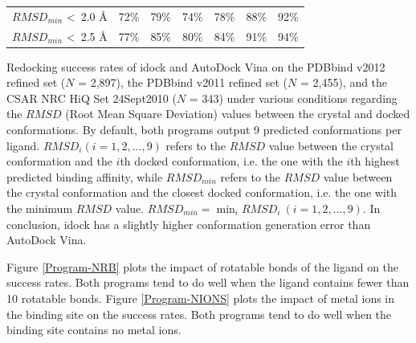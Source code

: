 \begin{table}
\begin{tabular}{lrrrrrr}
$RMSD_{min}$ \textless\ 2.0 \AA & 72\% & 79\% & 74\% & 78\% & 88\% & 92\%\\
$RMSD_{min}$ \textless\ 2.5 \AA & 77\% & 85\% & 80\% & 84\% & 91\% & 94\%\\
\end{tabular}
\begin{flushleft}
\label{SuccessRate} Redocking success rates of idock and AutoDock Vina on the PDBbind v2012 refined set ($N$ = 2,897), the PDBbind v2011 refined set ($N$ = 2,455), and the CSAR NRC HiQ Set 24Sept2010 ($N$ = 343) under various conditions regarding the $RMSD$ (Root Mean Square Deviation) values between the crystal and docked conformations. By default, both programs output 9 predicted conformations per ligand. $RMSD_i (i = 1,2,...,9)$ refers to the $RMSD$ value between the crystal conformation and the $i$th docked conformation, i.e. the one with the $i$th highest predicted binding affinity, while $RMSD_{min}$ refers to the $RMSD$ value between the crystal conformation and the closest docked conformation, i.e. the one with the minimum $RMSD$ value. $RMSD_{min} = \displaystyle\min_{i}RMSD_i\ (i = 1,2,...,9)$. In conclusion, idock has a slightly higher conformation generation error than AutoDock Vina.
\end{flushleft}
\end{table}

Figure \ref{Program-NRB} plots the impact of rotatable bonds of the ligand on the success rates. Both programs tend to do well when the ligand contains fewer than 10 rotatable bonds. Figure \ref{Program-NIONS} plots the impact of metal ions in the binding site on the success rates. Both programs tend to do well when the binding site contains no metal ions.

